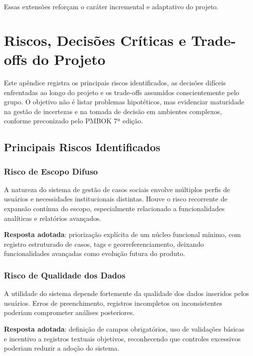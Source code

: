 Essas extensões reforçam o caráter incremental e adaptativo do projeto.

\chapter{Riscos, Decisões Críticas e Trade-offs do Projeto}\label{apx:riscos}

Este apêndice registra os principais riscos identificados, as decisões difíceis enfrentadas ao longo do projeto e os trade-offs assumidos conscientemente pelo grupo. O objetivo não é listar problemas hipotéticos, mas evidenciar maturidade na gestão de incertezas e na tomada de decisão em ambientes complexos, conforme preconizado pelo PMBOK 7ª edição.

\section{Principais Riscos Identificados}

\subsection{Risco de Escopo Difuso}

A natureza do sistema de gestão de casos sociais envolve múltiplos perfis de usuários e necessidades institucionais distintas. Houve o risco recorrente de expansão contínua do escopo, especialmente relacionado a funcionalidades analíticas e relatórios avançados.

\textbf{Resposta adotada}: priorização explícita de um núcleo funcional mínimo, com registro estruturado de casos, tags e georreferenciamento, deixando funcionalidades avançadas como evolução futura do produto.

\subsection{Risco de Qualidade dos Dados}

A utilidade do sistema depende fortemente da qualidade dos dados inseridos pelos usuários. Erros de preenchimento, registros incompletos ou inconsistentes poderiam comprometer análises posteriores.

\textbf{Resposta adotada}: definição de campos obrigatórios, uso de validações básicas e incentivo a registros textuais objetivos, reconhecendo que controles excessivos poderiam reduzir a adoção do sistema.

